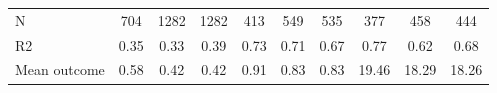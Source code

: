 \begin{tabular}{lccc|ccc|ccc}
N           &         704         &        1282         &        1282         &         413         &         549         &         535         &         377         &         458         &         444         \\
R2          &        0.35         &        0.33         &        0.39         &        0.73         &        0.71         &        0.67         &        0.77         &        0.62         &        0.68         \\
Mean outcome&        0.58         &        0.42         &        0.42         &        0.91         &        0.83         &        0.83         &       19.46         &       18.29         &       18.26         \\
\bottomrule \end{tabular}
